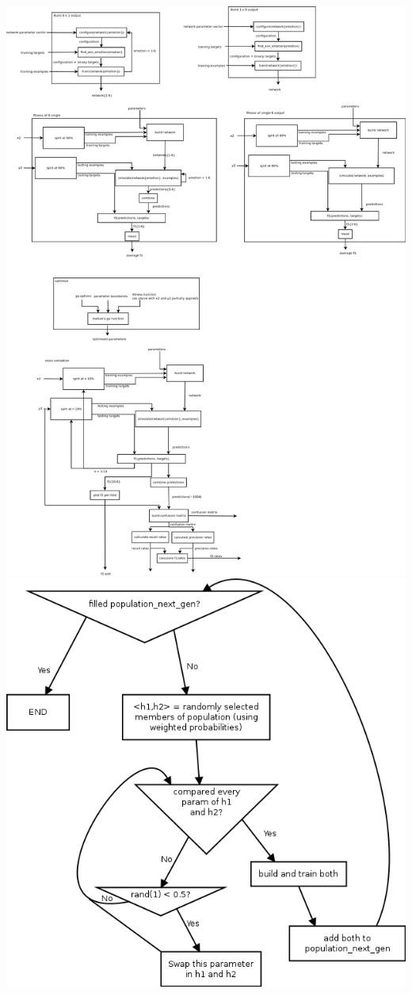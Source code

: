 \documentclass[11pt]{article}
\begin{document}
\includegraphics[width=\linewidth]{build_networks.png}
\includegraphics[width=\linewidth]{crossover.png}
\end{document}

